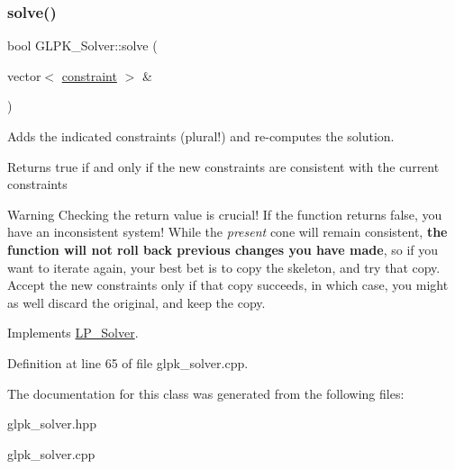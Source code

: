 \subsubsection{\texorpdfstring{solve()}{solve()}\hspace{0.1cm}{\footnotesize\ttfamily [2/2]}}
{\footnotesize\ttfamily bool G\+L\+P\+K\+\_\+\+Solver\+::solve (\begin{DoxyParamCaption}\item[{vector$<$ \hyperlink{classconstraint}{constraint} $>$ \&}]{ }\end{DoxyParamCaption})\hspace{0.3cm}{\ttfamily [virtual]}}



Adds the indicated constraints (plural!) and re-\/computes the solution. 

\begin{DoxyReturn}{Returns}
{\ttfamily true} if and only if the new constraints are consistent with the current constraints
\end{DoxyReturn}
\begin{DoxyWarning}{Warning}
Checking the return value is crucial! If the function returns {\ttfamily false}, you have an inconsistent system! While the {\itshape present} cone will remain consistent, {\bfseries the function will not roll back previous changes you have made}, so if you want to iterate again, your best bet is to copy the skeleton, and try that copy. Accept the new constraints only if that copy succeeds, in which case, you might as well discard the original, and keep the copy. 
\end{DoxyWarning}


Implements \hyperlink{class_l_p___solver_a35da4bdf5db971c445f495b6eaab072d}{L\+P\+\_\+\+Solver}.



Definition at line 65 of file glpk\+\_\+solver.\+cpp.



The documentation for this class was generated from the following files\+:\begin{DoxyCompactItemize}
\item 
glpk\+\_\+solver.\+hpp\item 
glpk\+\_\+solver.\+cpp\end{DoxyCompactItemize}
